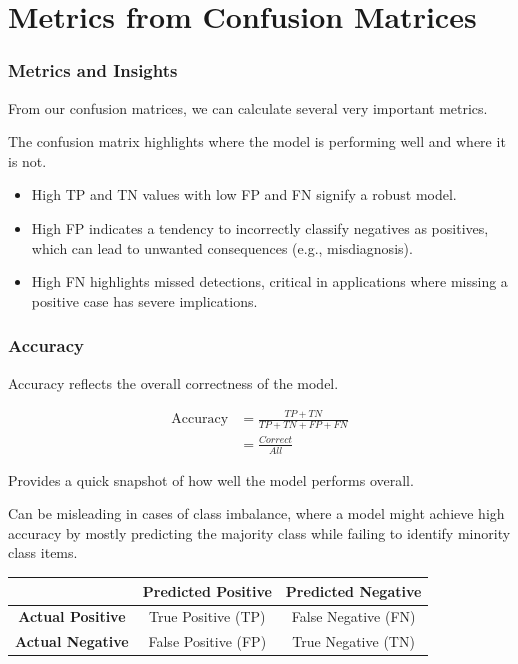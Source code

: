 \documentclass[aspectratio=169]{beamer} %
\begin{document}
\section{Metrics from Confusion Matrices}
	\begin{frame}
		\frametitle{Metrics and Insights}
		From our confusion matrices, we can calculate several very important metrics.

    	The confusion matrix highlights where the model is performing well and where it is not.
    	\begin{itemize}
    		\item High TP and TN values with low FP and FN signify a robust model.
    		\item High FP indicates a tendency to incorrectly classify negatives as positives, which can lead to unwanted consequences (e.g., misdiagnosis).
    		\item High FN highlights missed detections, critical in applications where missing a positive case has severe implications.
    	\end{itemize}

	\end{frame}

	\begin{frame}
		\frametitle{Accuracy}
		Accuracy reflects the overall correctness of the model.

		\begin{align*}
			\mathrm{Accuracy} &= \frac{TP+TN}{TP+TN+FP+FN} \\
								&= \frac{Correct}{All}
		\end{align*}

		Provides a quick snapshot of how well the model performs overall.

		Can be misleading in cases of class imbalance, where a model might achieve high accuracy by mostly predicting the majority class while failing to identify minority class items.

		\begin{center}
			\begin{tabular}{|c|c|c|}
				\hline
				& \textbf{Predicted Positive} & \textbf{Predicted Negative} \\
				\hline
				\textbf{Actual Positive} & True Positive (TP) & False Negative (FN) \\
				\hline
				\textbf{Actual Negative} & False Positive (FP) & True Negative (TN) \\
				\hline
			\end{tabular}
		\end{center}
	\end{frame}
\end{document}

